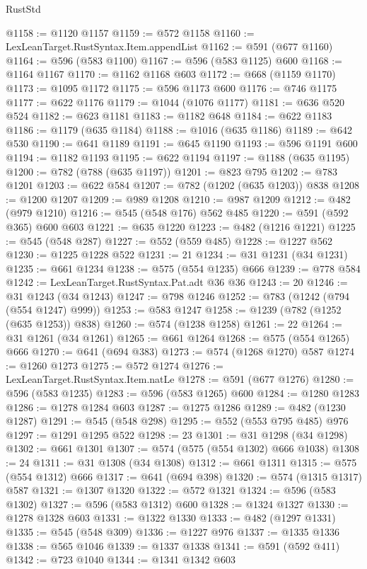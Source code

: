 \begin{lexlean}{RustStd}
\begin{coremodule}
@1158 := @1120 @1157
@1159 := @572 @1158
@1160 := LexLeanTarget.RustSyntax.Item.appendList
@1162 := @591 (@677 @1160)
@1164 := @596 (@583 @1100)
@1167 := @596 (@583 @1125) @600
@1168 := @1164 @1167
@1170 := @1162 @1168 @603
@1172 := @668 (@1159 @1170)
@1173 := @1095 @1172
@1175 := @596 @1173 @600
@1176 := @746 @1175
@1177 := @622 @1176
@1179 := @1044 (@1076 @1177)
@1181 := @636 @520 @524
@1182 := @623 @1181
@1183 := @1182 @648
@1184 := @622 @1183
@1186 := @1179 (@635 @1184)
@1188 := @1016 (@635 @1186)
@1189 := @642 @530
@1190 := @641 @1189
@1191 := @645 @1190
@1193 := @596 @1191 @600
@1194 := @1182 @1193
@1195 := @622 @1194
@1197 := @1188 (@635 @1195)
@1200 := @782 (@788 (@635 @1197))
@1201 := @823 @795
@1202 := @783 @1201
@1203 := @622 @584
@1207 := @782 (@1202 (@635 @1203)) @838
@1208 := @1200 @1207
@1209 := @989 @1208
@1210 := @987 @1209
@1212 := @482 (@979 @1210)
@1216 := @545 (@548 @176) @562 @485
@1220 := @591 (@592 @365) @600 @603
@1221 := @635 @1220
@1223 := @482 (@1216 @1221)
@1225 := @545 (@548 @287)
@1227 := @552 (@559 @485)
@1228 := @1227 @562
@1230 := @1225 @1228 @522
@1231 := 21
@1234 := @31 @1231 (@34 @1231)
@1235 := @661 @1234
@1238 := @575 (@554 @1235) @666
@1239 := @778 @584
@1242 := LexLeanTarget.RustSyntax.Pat.adt @36 @36
@1243 := 20
@1246 := @31 @1243 (@34 @1243)
@1247 := @798 @1246
@1252 := @783 (@1242 (@794 (@554 @1247) @999))
@1253 := @583 @1247
@1258 := @1239 (@782 (@1252 (@635 @1253)) @838)
@1260 := @574 (@1238 @1258)
@1261 := 22
@1264 := @31 @1261 (@34 @1261)
@1265 := @661 @1264
@1268 := @575 (@554 @1265) @666
@1270 := @641 (@694 @383)
@1273 := @574 (@1268 @1270) @587
@1274 := @1260 @1273
@1275 := @572 @1274
@1276 := LexLeanTarget.RustSyntax.Item.natLe
@1278 := @591 (@677 @1276)
@1280 := @596 (@583 @1235)
@1283 := @596 (@583 @1265) @600
@1284 := @1280 @1283
@1286 := @1278 @1284 @603
@1287 := @1275 @1286
@1289 := @482 (@1230 @1287)
@1291 := @545 (@548 @298)
@1295 := @552 (@553 @795 @485) @976
@1297 := @1291 @1295 @522
@1298 := 23
@1301 := @31 @1298 (@34 @1298)
@1302 := @661 @1301
@1307 := @574 (@575 (@554 @1302) @666 @1038)
@1308 := 24
@1311 := @31 @1308 (@34 @1308)
@1312 := @661 @1311
@1315 := @575 (@554 @1312) @666
@1317 := @641 (@694 @398)
@1320 := @574 (@1315 @1317) @587
@1321 := @1307 @1320
@1322 := @572 @1321
@1324 := @596 (@583 @1302)
@1327 := @596 (@583 @1312) @600
@1328 := @1324 @1327
@1330 := @1278 @1328 @603
@1331 := @1322 @1330
@1333 := @482 (@1297 @1331)
@1335 := @545 (@548 @309)
@1336 := @1227 @976
@1337 := @1335 @1336
@1338 := @565 @1046
@1339 := @1337 @1338
@1341 := @591 (@592 @411)
@1342 := @723 @1040
@1344 := @1341 @1342 @603

\end{coremodule}
\end{lexlean}
